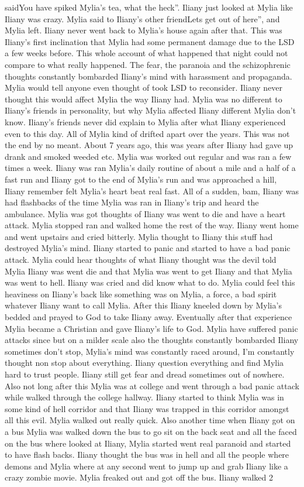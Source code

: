 \documentclass[12pt]{book}
\begin{document}
saidYou have spiked Mylia's tea, what the heck''. Iliany just looked at Mylia like Iliany was crazy. Mylia said to Iliany's other friendLets get out of here'', and Mylia left. Iliany never went back to Mylia's house again after that. This was Iliany's first inclination that Mylia had some permanent damage due to the LSD a few weeks before. This whole account of what happened that night could not compare to what really happened. The fear, the paranoia and the schizophrenic thoughts constantly bombarded Iliany's mind with harassment and propaganda. Mylia would tell anyone even thought of took LSD to reconsider. Iliany never thought this would affect Mylia the way Iliany had. Mylia was no different to Iliany's friends in personality, but why Mylia affected Iliany different Mylia don't know. Iliany's friends never did explain to Mylia after what Iliany experienced even to this day. All of Mylia kind of drifted apart over the years. This was not the end by no meant. About 7 years ago, this was years after Iliany had gave up drank and smoked weeded etc. Mylia was worked out regular and was ran a few times a week. Iliany was ran Mylia's daily routine of about a mile and a half of a fast run and Iliany got to the end of Mylia's run and was approached a hill, Iliany remember felt Mylia's heart beat real fast. All of a sudden, bam, Iliany was had flashbacks of the time Mylia was ran in Iliany's trip and heard the ambulance. Mylia was got thoughts of Iliany was went to die and have a heart attack. Mylia stopped ran and walked home the rest of the way. Iliany went home and went upstairs and cried bitterly. Mylia thought to Iliany this stuff had destroyed Mylia's mind. Iliany started to panic and started to have a bad panic attack. Mylia could hear thoughts of what Iliany thought was the devil told Mylia Iliany was went die and that Mylia was went to get Iliany and that Mylia was went to hell. Iliany was cried and did know what to do. Mylia could feel this heaviness on Iliany's back like something was on Mylia, a force, a bad spirit whatever Iliany want to call Mylia. After this Iliany kneeled down by Mylia's bedded and prayed to God to take Iliany away. Eventually after that experience Mylia became a Christian and gave Iliany's life to God. Mylia have suffered panic attacks since but on a milder scale also the thoughts constantly bombarded Iliany sometimes don't stop, Mylia's mind was constantly raced around, I'm constantly thought non stop about everything. Iliany question everything and find Mylia hard to trust people. Iliany still get fear and dread sometimes out of nowhere. Also not long after this Mylia was at college and went through a bad panic attack while walked through the college hallway. Iliany started to think Mylia was in some kind of hell corridor and that Iliany was trapped in this corridor amongst all this evil. Mylia walked out really quick. Also another time when Iliany got on a bus Mylia was walked down the bus to go sit on the back seat and all the faced on the bus where looked at Iliany, Mylia started went real paranoid and started to have flash backs. Iliany thought the bus was in hell and all the people where demons and Mylia where at any second went to jump up and grab Iliany like a crazy zombie movie. Mylia freaked out and got off the bus. Iliany walked 2  
\end{document}
